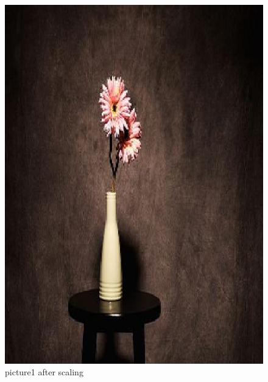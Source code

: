 \documentclass[final]{cvpr}
\begin{document}
\begin{figure}
\begin{center}
    \includegraphics[scale=0.15]{pics/2-2.png}
    \caption{picture1 after scaling}
    \label{pic2-2}

\end{center}
\end{figure}
\end{document}
